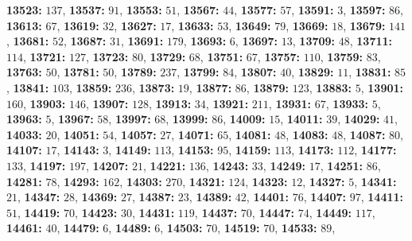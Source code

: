 \textsf{\bfseries 13523:} $137$, \textsf{\bfseries 13537:} $91$, \textsf{\bfseries 13553:} $51$, \textsf{\bfseries 13567:} $44$, \textsf{\bfseries 13577:} $57$, \textsf{\bfseries 13591:} $3$, \textsf{\bfseries 13597:} $86$, \textsf{\bfseries 13613:} $67$, \textsf{\bfseries 13619:} $32$, \textsf{\bfseries 13627:} $17$, \textsf{\bfseries 13633:} $53$, \textsf{\bfseries 13649:} $79$, \textsf{\bfseries 13669:} $18$, \textsf{\bfseries 13679:} $141$, \textsf{\bfseries 13681:} $52$, \textsf{\bfseries 13687:} $31$, \textsf{\bfseries 13691:} $179$, \textsf{\bfseries 13693:} $6$, \textsf{\bfseries 13697:} $13$, \textsf{\bfseries 13709:} $48$, \textsf{\bfseries 13711:} $114$, \textsf{\bfseries 13721:} $127$, \textsf{\bfseries 13723:} $80$, \textsf{\bfseries 13729:} $68$, \textsf{\bfseries 13751:} $67$, \textsf{\bfseries 13757:} $110$, \textsf{\bfseries 13759:} $83$, \textsf{\bfseries 13763:} $50$, \textsf{\bfseries 13781:} $50$, \textsf{\bfseries 13789:} $237$, \textsf{\bfseries 13799:} $84$, \textsf{\bfseries 13807:} $40$, \textsf{\bfseries 13829:} $11$, \textsf{\bfseries 13831:} $85$, \textsf{\bfseries 13841:} $103$, \textsf{\bfseries 13859:} $236$, \textsf{\bfseries 13873:} $19$, \textsf{\bfseries 13877:} $86$, \textsf{\bfseries 13879:} $123$, \textsf{\bfseries 13883:} $5$, \textsf{\bfseries 13901:} $160$, \textsf{\bfseries 13903:} $146$, \textsf{\bfseries 13907:} $128$, \textsf{\bfseries 13913:} $34$, \textsf{\bfseries 13921:} $211$, \textsf{\bfseries 13931:} $67$, \textsf{\bfseries 13933:} $5$, \textsf{\bfseries 13963:} $5$, \textsf{\bfseries 13967:} $58$, \textsf{\bfseries 13997:} $68$, \textsf{\bfseries 13999:} $86$, \textsf{\bfseries 14009:} $15$, \textsf{\bfseries 14011:} $39$, \textsf{\bfseries 14029:} $41$, \textsf{\bfseries 14033:} $20$, \textsf{\bfseries 14051:} $54$, \textsf{\bfseries 14057:} $27$, \textsf{\bfseries 14071:} $65$, \textsf{\bfseries 14081:} $48$, \textsf{\bfseries 14083:} $48$, \textsf{\bfseries 14087:} $80$, \textsf{\bfseries 14107:} $17$, \textsf{\bfseries 14143:} $3$, \textsf{\bfseries 14149:} $113$, \textsf{\bfseries 14153:} $95$, \textsf{\bfseries 14159:} $113$, \textsf{\bfseries 14173:} $112$, \textsf{\bfseries 14177:} $133$, \textsf{\bfseries 14197:} $197$, \textsf{\bfseries 14207:} $21$, \textsf{\bfseries 14221:} $136$, \textsf{\bfseries 14243:} $33$, \textsf{\bfseries 14249:} $17$, \textsf{\bfseries 14251:} $86$, \textsf{\bfseries 14281:} $78$, \textsf{\bfseries 14293:} $162$, \textsf{\bfseries 14303:} $270$, \textsf{\bfseries 14321:} $124$, \textsf{\bfseries 14323:} $12$, \textsf{\bfseries 14327:} $5$, \textsf{\bfseries 14341:} $21$, \textsf{\bfseries 14347:} $28$, \textsf{\bfseries 14369:} $27$, \textsf{\bfseries 14387:} $23$, \textsf{\bfseries 14389:} $42$, \textsf{\bfseries 14401:} $76$, \textsf{\bfseries 14407:} $97$, \textsf{\bfseries 14411:} $51$, \textsf{\bfseries 14419:} $70$, \textsf{\bfseries 14423:} $30$, \textsf{\bfseries 14431:} $119$, \textsf{\bfseries 14437:} $70$, \textsf{\bfseries 14447:} $74$, \textsf{\bfseries 14449:} $117$, \textsf{\bfseries 14461:} $40$, \textsf{\bfseries 14479:} $6$, \textsf{\bfseries 14489:} $6$, \textsf{\bfseries 14503:} $70$, \textsf{\bfseries 14519:} $70$, \textsf{\bfseries 14533:} $89$, 

